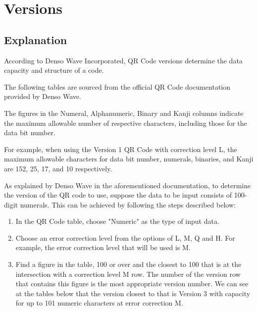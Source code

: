 \documentclass[../../2_codex]{subfiles}
\begin{document}
\section{Versions}

\subsection{Explanation}

According to Denso Wave Incorporated, QR Code versions determine the data capacity and structure of a code\cite{denso-wave-qr-versions}.

The following tables are sourced from the official QR Code documentation provided by Denso Wave.

The figures in the Numeral, Alphanumeric, Binary and Kanji columns indicate the maximum allowable number of respective characters, including those for the data bit number.

For example, when using the Version 1 QR Code with correction level L, the maximum allowable characters for data bit number, numerals, binaries, and Kanji are 152, 25, 17, and 10 respectively.

As explained by Denso Wave in the aforementioned documentation, to determine the version of the QR code to use, suppose the data to be input consists of 100-digit numerals. This can be achieved by following the steps described below\cite{denso-wave-qr-versions}:

\begin{enumerate}
  \item In the QR Code table, choose "Numeric" as the type of input data.
  \item Choose an error correction level from the options of L, M, Q and H. For example, the error correction level that will be used is M.
  \item Find a figure in the table, 100 or over and the closest to 100 that is at the intersection with a correction level M row. The number of the version row that contains this figure is the most appropriate version number. We can see at the tables below that the version closest to that is Version 3 with capacity for up to 101 numeric characters at error correction M. 
\end{enumerate}
\end{document}

